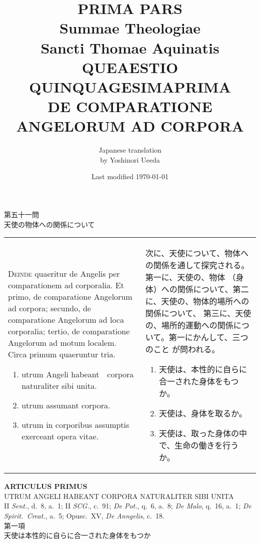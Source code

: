 \documentclass[10pt]{jsarticle} %
\title{{\bf PRIMA PARS}\\{\HUGE Summae Theologiae}\\Sancti Thomae
Aquinatis\\{\sffamily QUEAESTIO QUINQUAGESIMAPRIMA}\\DE COMPARATIONE
ANGELORUM AD CORPORA}
\author{Japanese translation\\by Yoshinori {\sc Ueeda}}
\date{Last modified \today}
\begin{document}
\maketitle
\pagestyle{fancy}

\begin{center}
{\Large 第五十一問\\天使の物体への関係について}
\end{center}

\begin{longtable}{p{21em}p{21em}}

{\huge D}{\scshape einde} quaeritur de Angelis per comparationem ad
corporalia. Et primo, de comparatione Angelorum ad corpora; secundo, de
comparatione Angelorum ad loca corporalia; tertio, de comparatione
Angelorum ad motum localem. Circa primum quaeruntur tria.


\begin{enumerate}
 \item utrum Angeli habeant　corpora naturaliter sibi unita. 
 \item utrum assumant corpora. 
 \item utrum in corporibus assumptis exerceant opera vitae.
\end{enumerate}

&

次に、天使について、物体への関係を通して探究される。第一に、天使の、物体
 （身体）への関係について、第二に、天使の、物体的場所への関係について、
 第三に、天使の、場所的運動への関係について。第一にかんして、三つのこと
 が問われる。

\begin{enumerate}
 \item 天使は、本性的に自らに合一された身体をもつか。
 \item 天使は、身体を取るか。
 \item 天使は、取った身体の中で、生命の働きを行うか。
\end{enumerate}

\end{longtable}
\newpage


\begin{center}
 {\Large {\bf ARTICULUS PRIMUS}}\\
 {\large UTRUM ANGELI HABEANT CORPORA NATURALITER SIBI UNITA}\\
 {\footnotesize II {\itshape Sent.}, d.~8, a.~1; II {\itshape SCG.},
 c.~91; {\itshape De Pot.}, q.~6, a.~8; {\itshape De Malo}, q.~16, a.~1;
 {\itshape De Spirit.~Creat.}, a.~5; Opusc.~XV, {\itshape De Anngelis}, c.~18.}\\
 {\Large 第一項\\天使は本性的に自らに合一された身体をもつか}
\end{center}
\end{document}
